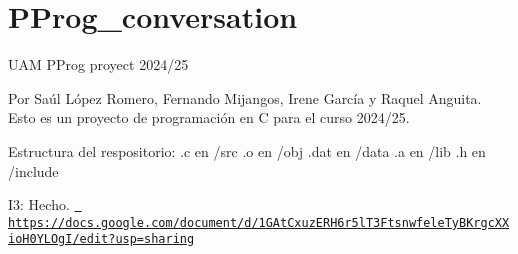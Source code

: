 \chapter{PProg\+\_\+conversation}
\hypertarget{md_README}{}\label{md_README}
\label{md_README_autotoc_md0}%
%
UAM PProg proyect 2024/25

Por Saúl López Romero, Fernando Mijangos, Irene García y Raquel Anguita. Esto es un proyecto de programación en C para el curso 2024/25.

Estructura del respositorio\+: .c en /src .o en /obj .dat en /data .a en /lib .h en /include

I3\+: Hecho. \href{https://docs.google.com/document/d/1GAtCxuzERH6r5lT3FtsnwfeleTyBKrgcXXioH0YLOgI/edit?usp=sharing}{\texttt{ https\+://docs.\+google.\+com/document/d/1\+GAt\+Cxuz\+ERH6r5l\+T3\+Ftsnwfele\+Ty\+BKrgc\+XXio\+H0\+YLOg\+I/edit?usp=sharing}} 